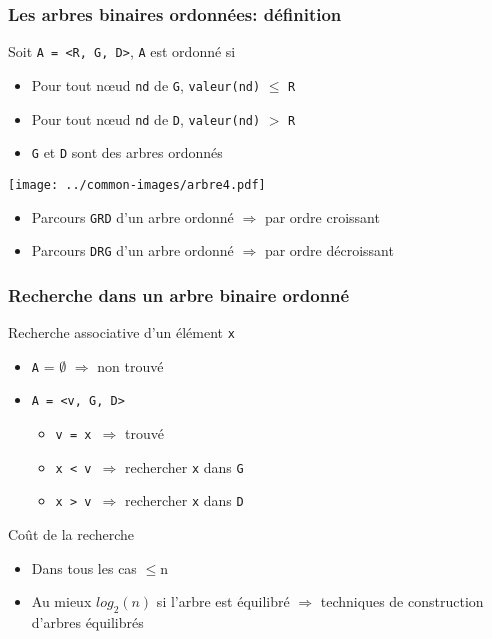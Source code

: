 \documentclass[table,handout,tikz,12pt,svgnames]{beamer}
\begin{document}
\begin{frame}[fragile=singleslide]
	\frametitle{Les arbres binaires ordonnées: définition}
	\begin{block}{Soit \texttt{A = <R, G, D>}, \texttt{A} est ordonné si}
		\begin{itemize}
			\item Pour tout nœud \texttt{nd} de \texttt{G}, \texttt{valeur(nd)} $\leq$ \texttt{R}
			\item Pour tout nœud \texttt{nd} de \texttt{D}, \texttt{valeur(nd)} $>$ \texttt{R}
			\item \texttt{G} et \texttt{D} sont des arbres ordonnés
		\end{itemize}
	\end{block}
	\begin{center}
		{\texttt{[image: ../common-images/arbre4.pdf]}}
	\end{center}
	\vspace{-1.1cm}
	\begin{block}{}
		\begin{itemize}
			\item Parcours \texttt{GRD} d'un arbre ordonné $\Rightarrow$ par ordre croissant
			\item Parcours \texttt{DRG} d'un arbre ordonné $\Rightarrow$ par ordre décroissant
		\end{itemize}
	\end{block}
\end{frame}


\begin{frame}[fragile=singleslide]
	\frametitle{Recherche dans un arbre binaire ordonné}
	\begin{block}{Recherche associative d'un élément \texttt{x}}
		\begin{itemize}
			\item \texttt{A} = $\emptyset$ $\Rightarrow$ non trouvé
			\item \texttt{A = <v, G, D>}
			\begin{itemize}
				\item \texttt{v = x $\Rightarrow$} trouvé
				\item \texttt{x < v $\Rightarrow$} rechercher \texttt{x} dans \texttt{G}
				\item \texttt{x > v $\Rightarrow$} rechercher \texttt{x} dans \texttt{D}
			\end{itemize}
		\end{itemize}
	\end{block}
	\begin{block}{Coût de la recherche}
		\begin{itemize}
			\item Dans tous les cas $\leq$n
			\item Au mieux $log_2(n)$ si l'arbre est équilibré $\Rightarrow$ techniques de construction d'arbres équilibrés
		\end{itemize}
	\end{block}
\end{frame}
\end{document}
